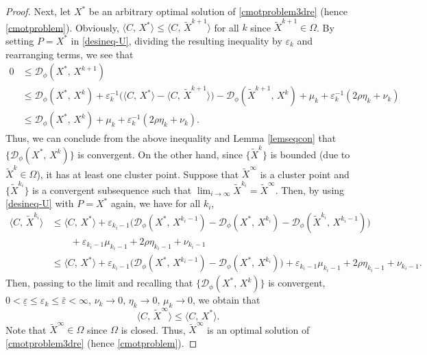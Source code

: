 \documentclass[10pt]{article}
\begin{document}
\begin{proof}
Next, let $X^*$ be an arbitrary optimal solution of \eqref{cmotproblem3dre} (hence \eqref{cmotproblem}). Obviously, $\langle C,\,X^*\rangle \leq \langle C, \,\widetilde{X}^{k+1}\rangle$ for all $k$ since $\widetilde{X}^{k+1}\in\Omega$. By setting $P=X^*$ in \eqref{desineq-U}, dividing the resulting inequality by $\varepsilon_k$ and rearranging terms, we see that
\begin{equation}\label{desineq-Xstar}
\begin{aligned}
0&\leq\mathcal{D}_{\phi}(X^*,\,X^{k+1}) \\
&\leq \mathcal{D}_{\phi}(X^*,\,X^k) + \varepsilon_k^{-1}\big(\langle C, \,X^*\rangle-\langle C, \,\widetilde{X}^{k+1}\rangle\big) -\mathcal{D}_{\phi}(\widetilde{X}^{k+1},\,X^k) + \mu_k + \varepsilon_k^{-1}(2\rho\eta_k + \nu_k) \\
&\leq \mathcal{D}_{\phi}(X^*,\,X^k) + \mu_k + \varepsilon_k^{-1}(2\rho\eta_k + \nu_k).
\end{aligned}
\end{equation}
Thus, we can conclude from the above inequality and Lemma \ref{lemseqcon} that $\{\mathcal{D}_{\phi}(X^*,\,X^k)\}$ is convergent. On the other hand, since $\{\widetilde{X}^k\}$ is bounded (due to $\widetilde{X}^k\in\Omega$), it has at least one cluster point. Suppose that $\widetilde{X}^{\infty}$ is a cluster point and $\{\widetilde{X}^{k_i}\}$ is a convergent subsequence such that $\lim_{i\to\infty} \widetilde{X}^{k_i} = \widetilde{X}^{\infty}$. Then, by using \eqref{desineq-U} with $P=X^*$ again, we have for all $k_i$,
\begin{equation*}%
\begin{aligned}
\langle C, \,\widetilde{X}^{k_i}\rangle
&\leq \langle C, \,X^*\rangle + \varepsilon_{k_i-1}\big( \mathcal{D}_{\phi}(X^*,\,X^{k_i-1})
-\mathcal{D}_{\phi}(X^*,\,X^{k_i}) -\mathcal{D}_{\phi}(\widetilde{X}^{k_i},\,X^{k_i-1}) \big) \\
&\qquad + \varepsilon_{k_i-1}\mu_{k_i-1} + 2\rho\eta_{k_i-1} + \nu_{k_i-1}  \\
&\leq \langle C, \,X^*\rangle + \varepsilon_{k_i-1}\big( \mathcal{D}_{\phi}(X^*,\,X^{k_i-1})
-\mathcal{D}_{\phi}(X^*,\,X^{k_i}) \big)
+ \varepsilon_{k_i-1}\mu_{k_i-1} + 2\rho\eta_{k_i-1} + \nu_{k_i-1}.
\end{aligned}
\end{equation*}
Then, passing to the limit and recalling that $\{\mathcal{D}_{\phi}(X^*,\,X^k)\}$ is convergent, $0<\underline{\varepsilon}\leq\varepsilon_k\leq\bar{\varepsilon}<\infty$, $\nu_k\to0$, $\eta_k\to0$, $\mu_k\to0$, we obtain that
\begin{equation*}
\langle C, \,\widetilde{X}^{\infty}\rangle \leq \langle C, \,X^*\rangle.
\end{equation*}
Note that $\widetilde{X}^{\infty}\in\Omega$ since $\Omega$ is closed. Thus, $\widetilde{X}^{\infty}$ is an optimal solution of \eqref{cmotproblem3dre} (hence \eqref{cmotproblem}).


\end{proof}
\end{document}

